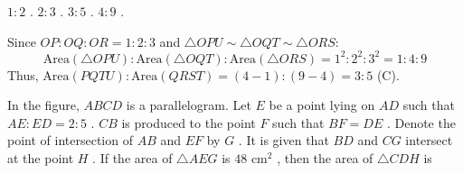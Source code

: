 \begin{minipage}{0.45\textwidth}
\begin{choices}
    \choice $1 : 2$ .
    \choice $2 : 3$ .
    \correctchoice $3 : 5$ .
    \choice $4 : 9$ .
\end{choices}
\end{minipage}
\begin{minipage}{0.52\textwidth}
\centering
{}
\end{minipage}
\begin{solution}
Since $OP : OQ : OR = 1 : 2 : 3$ and $\triangle OPU \sim \triangle OQT \sim \triangle ORS$:
\[ \text{Area}(\triangle OPU) : \text{Area}(\triangle OQT) : \text{Area}(\triangle ORS) = 1^2 : 2^2 : 3^2 = 1 : 4 : 9 \]
Thus, $\text{Area}(PQTU) : \text{Area}(QRST) = (4 - 1) : (9 - 4) = 3 : 5$ (C).
\end{solution}

\question In the figure, $ABCD$ is a parallelogram. Let $E$ be a point lying on $AD$ such that $AE : ED = 2 : 5$ . $CB$ is produced to the point $F$ such that $BF = DE$ . Denote the point of intersection of $AB$ and $EF$ by $G$ . It is given that $BD$ and $CG$ intersect at the point $H$ . If the area of $\triangle AEG$ is $48\text{ cm}^2$ , then the area of $\triangle CDH$ is

